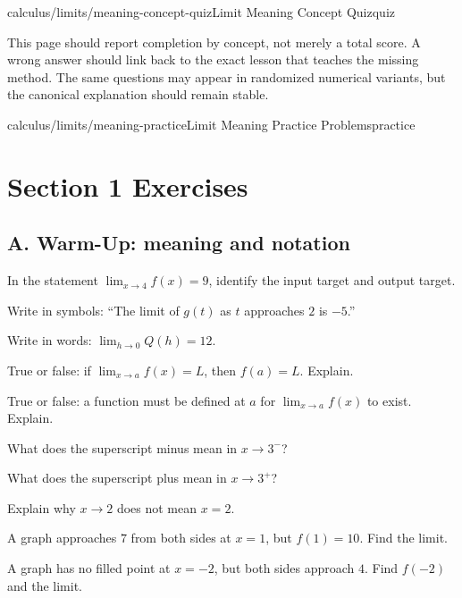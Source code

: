\begin{webpage}{calculus/limits/meaning-concept-quiz}{Limit Meaning Concept Quiz}{quiz}
\begin{bgsummary}[title={Quiz use on the website}]
This page should report completion by concept, not merely a total score. A wrong answer should link back to the exact lesson that teaches the missing method. The same questions may appear in randomized numerical variants, but the canonical explanation should remain stable.
\end{bgsummary}
\end{webpage}

\begin{webpage}{calculus/limits/meaning-practice}{Limit Meaning Practice Problems}{practice}
\section*{Section 1 Exercises}

\subsection*{A. Warm-Up: meaning and notation}

\begin{bgexercises}[label=\textbf{1.\arabic*}]
  \item In the statement \(\lim_{x\to4}f(x)=9\), identify the input target and output target.
  \item Write in symbols: ``The limit of \(g(t)\) as \(t\) approaches \(2\) is \(-5\).''
  \item Write in words: \(\lim_{h\to0}Q(h)=12\).
  \item True or false: if \(\lim_{x\to a}f(x)=L\), then \(f(a)=L\). Explain.
  \item True or false: a function must be defined at \(a\) for \(\lim_{x\to a}f(x)\) to exist. Explain.
  \item What does the superscript minus mean in \(x\to3^-\)?
  \item What does the superscript plus mean in \(x\to3^+\)?
  \item Explain why \(x\to2\) does not mean \(x=2\).
  \item A graph approaches \(7\) from both sides at \(x=1\), but \(f(1)=10\). Find the limit.
  \item A graph has no filled point at \(x=-2\), but both sides approach \(4\). Find \(f(-2)\) and the limit.
\end{bgexercises}


\end{webpage}

